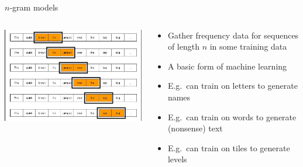 \begin{frame}{$n$-gram models}
	\begin{columns}
		\begin{column}{0.4\textwidth}
			\includegraphics[width=\textwidth]{ngram}
		\end{column}
		\begin{column}{0.55\textwidth}
			\begin{itemize}
                \pause\item Gather frequency data for sequences of length $n$ in some training data
                \pause\item A basic form of machine learning
                \pause\item E.g.\ can train on letters to generate names
                \pause\item E.g.\ can train on words to generate (nonsense) text
                \pause\item E.g.\ can train on tiles to generate levels
			\end{itemize}
		\end{column}
	\end{columns}
\end{frame}

